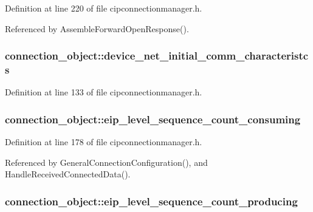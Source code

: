 \-Definition at line 220 of file cipconnectionmanager.\-h.



\-Referenced by \-Assemble\-Forward\-Open\-Response().

\hypertarget{structconnection__object_ab5785c1cdbec9a8fe27ad653c8ffa494}{
\subsubsection[{device\-\_\-net\-\_\-initial\-\_\-comm\-\_\-characteristcs}]{ {\bf connection\-\_\-object\-::device\-\_\-net\-\_\-initial\-\_\-comm\-\_\-characteristcs}}}\label{d1/d48/structconnection__object_ab5785c1cdbec9a8fe27ad653c8ffa494}


\-Definition at line 133 of file cipconnectionmanager.\-h.

\hypertarget{structconnection__object_afbd9213eab498a24101461bd504edfa6}{
\subsubsection[{eip\-\_\-level\-\_\-sequence\-\_\-count\-\_\-consuming}]{ {\bf connection\-\_\-object\-::eip\-\_\-level\-\_\-sequence\-\_\-count\-\_\-consuming}}}\label{d1/d48/structconnection__object_afbd9213eab498a24101461bd504edfa6}


\-Definition at line 178 of file cipconnectionmanager.\-h.



\-Referenced by \-General\-Connection\-Configuration(), and \-Handle\-Received\-Connected\-Data().

\hypertarget{structconnection__object_aa31634b17dcfdd7d98ad8b4219558dbf}{
\subsubsection[{eip\-\_\-level\-\_\-sequence\-\_\-count\-\_\-producing}]{ {\bf connection\-\_\-object\-::eip\-\_\-level\-\_\-sequence\-\_\-count\-\_\-producing}}}\label{d1/d48/structconnection__object_aa31634b17dcfdd7d98ad8b4219558dbf}



